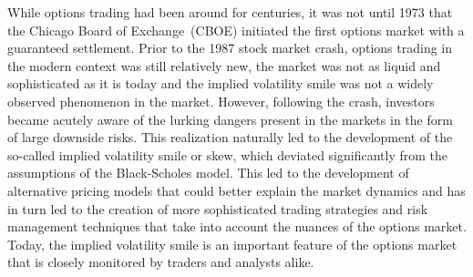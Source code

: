 While options trading had been around for centuries, it was not until 1973 that the Chicago Board of Exchange~(CBOE) initiated the first options market with a guaranteed settlement. Prior to the 1987 stock market crash, options trading in the modern context was still relatively new, the market was not as liquid and sophisticated as it is today and the implied volatility smile was not a widely observed phenomenon in the market. However, following the crash, investors became acutely aware of the lurking dangers present in the markets in the form of large downside risks. This realization naturally led to the development of the so-called implied volatility smile or skew, which deviated significantly from the assumptions of the Black-Scholes model.
This led to the development of alternative pricing models that could better explain the market dynamics and has in turn led to the creation of more sophisticated trading strategies and risk management techniques that take into account the nuances of the options market. Today, the implied volatility smile is an important feature of the options market that is closely monitored by traders and analysts alike.

